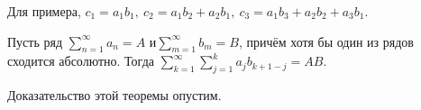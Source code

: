 \documentclass[a4paper, 12pt]{article}
\begin{document}
	Для примера, $c_1 = a_1b_1,\ c_2 = a_1b_2 + a_2b_1,\ c_3 = a_1b_3+a_2b_2+a_3b_1$.
	
	\begin{Theorem}[Мертенса]
		Пусть ряд $\sum\limits_{n=1}^{\infty}a_n = A $ и$ \sum\limits_{m=1}^{\infty}b_m = B$, причём хотя бы один из рядов сходится абсолютно. Тогда $\sum\limits_{k=1}^{\infty}\sum\limits_{j=1}^{k}a_jb_{k+1-j} = AB.$
	\end{Theorem}
	
	Доказательство этой теоремы опустим.
\end{document}
